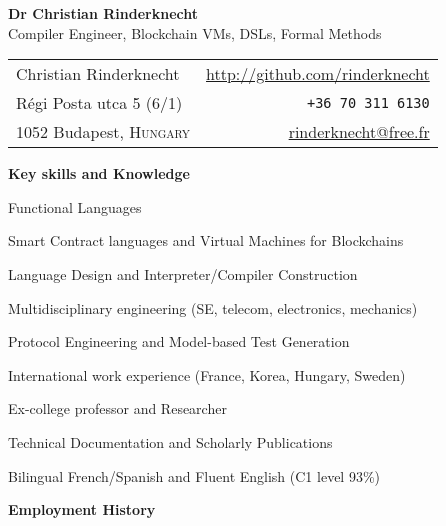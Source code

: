 \documentclass[a4paper,11pt]{article}
\begin{document}
\begin{center}
\textbf{\LARGE Dr Christian Rinderknecht}\\[5mm]
       {\large Compiler Engineer, Blockchain VMs, DSLs, Formal Methods}
\end{center}

\noindent
\begin{tabular}{@{}l@{\qquad\qquad\qquad\qquad}r@{}}
  Christian Rinderknecht
& \url{http://github.com/rinderknecht}\\
  Régi Posta utca 5 (6/1)
& \texttt{+36 70 311 6130}\\
  1052 Budapest, \textsc{Hungary}
& \url{rinderknecht@free.fr}
\end{tabular}

\medskip


\pagestyle{empty}

\bigskip
\noindent\textbf{\large Key skills and Knowledge}
\begin{itemize*}

  \item Functional Languages

  \item Smart Contract languages and Virtual Machines for Blockchains

  \item Language Design and Interpreter/Compiler Construction

  \item Multidisciplinary engineering (SE, telecom, electronics, mechanics)

  \item Protocol Engineering and Model-based Test Generation

  \item International work experience (France, Korea, Hungary, Sweden)

  \item Ex-college professor and Researcher

  \item Technical Documentation and Scholarly Publications

  \item Bilingual French/Spanish and Fluent English (C1 level 93\%)

\end{itemize*}

\smallskip
\noindent\textbf{\large Employment History}
\bigskip
\end{document}
